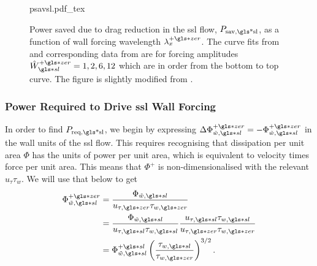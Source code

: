 \begin{figure}[htbp]
	\centering
	\def\svgwidth{0.7\textwidth}
	{psavsl.pdf_tex}
	\caption[$P_\text{sav,\gls*{sl}} $ as a function of wall forcing wavelength $\lambda_x\pz$]{Power saved due to drag reduction in the  \gls{ssl} flow, $P_\text{sav,\gls*{sl}} $, as a function of wall forcing wavelength $\lambda_x\pz$. The curve fits from \textcite{chernyshenko2013} and corresponding data from \textcite{viotti2009} are for forcing amplitudes $\hat{W}\pz\ssl=1,2,6,12$ which are in order from the bottom to top curve. The figure is slightly modified from \cite{chernyshenko2013}.} 
	\label{fig:psavsl}
\end{figure}

\subsubsection{Power Required to Drive \gls{ssl} Wall Forcing}
In order to find $P_\text{req,\gls*{sl}} $, we begin by expressing $\Delta \Phi _{\tilde{w},\gls*{sl}}\pz=-\Phi _{\tilde{w},\gls*{sl}}\pz$ in the wall units of the \gls{ssl} flow. This requires recognising that dissipation per unit area $\Phi $ has the units of power per unit area, which is equivalent to velocity times force per unit area. This means that $\Phi^{+} $ is non-dimensionalised with the relevant $u_\tau \tau_w$. We will use that below to get
\begin{align}
	\Phi _{\tilde{w},\gls*{sl}}\pz &= \frac{\Phi _{\tilde{w},\gls*{sl}}}{u_{\tau,\gls*{zer}}\tau_{w,\gls*{zer}}}\\
	&=  \frac{\Phi _{\tilde{w},\gls*{sl}}}{u_{\tau,\gls*{sl}}\tau_{w,\gls*{sl}}}\frac{u_{\tau,\gls*{sl}}\tau_{w,\gls*{sl}}}{u_{\tau,\gls*{zer}}\tau_{w,\gls*{zer}}}\\
	&= \Phi _{\tilde{w},\gls*{sl}}\ps \left( \frac{\tau_{w,\gls*{sl}}}{\tau_{w,\gls*{zer}}} \right) ^{3 /2}\label{eq:fislconv}
.\end{align}

